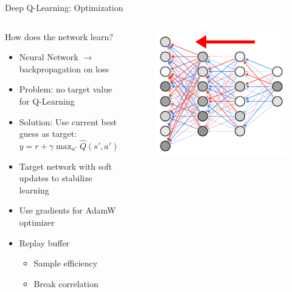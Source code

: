 \documentclass[10pt,xcolor=table, aspectratio=1610]{beamer}
\begin{document}
\begin{frame}{Deep Q-Learning: Optimization}
    \begin{columns}
      \begin{block}{How does the network learn?}
        \begin{itemize}
          \item Neural Network $\rightarrow$ backpropagation on loss
          \item Problem: no target value for Q-Learning
          \item Solution: Use current best guess as target: \\
                $y = r + \gamma \max_{a'} \hat{Q}(s', a')$
          \item Target network with soft updates to stabilize learning
          \item Use gradients for AdamW optimizer
          \item Replay buffer
                \begin{itemize}
                  \item Sample efficiency
                  \item Break correlation
                \end{itemize}
        \end{itemize}
      \end{block}
      \begin{figure}
        \includegraphics[width=\textwidth]{img/out/backprop.pdf}
      \end{figure}
    \end{columns}
\end{frame}
\end{document}
